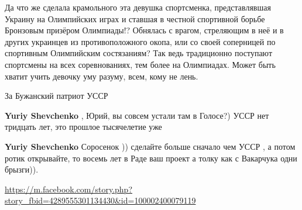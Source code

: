 \begin{itemize}
Да что же сделала крамольного эта девушка спортсменка, представлявшая Украину
на Олимпийских играх и ставшая в честной спортивной борьбе Бронзовым призёром
Олимпиады!? Обнялась с врагом, стреляющим в неё и в других украинцев из
противоположного окопа, или со своей соперницей по спортивным Олимпийским
состязаниям? Так ведь традиционно поступают спортсмены на всех соревнованиях,
тем более на Олимпиадах. Может быть хватит учить девочку уму разуму, всем, кому
не лень.


 
За Бужанский патриот УССР \Smiley[1.0][yellow]

\begin{itemize}
 
\textbf{Yuriy Shevchenko} , Юрий, вы совсем устали там в Голосе?) УССР нет тридцать лет, это прошлое тысячелетие уже

 
\textbf{Yuriy Shevchenko} Соросенок )) сделайте больше сначало чем УССР , а потом ротик открывайте, то восемь лет в Раде ваш проект а толку как с Вакарчука одни брызги)).
\end{itemize}

 
\url{https://m.facebook.com/story.php?story_fbid=4289555301134430&id=100002400079119}

 

\end{itemize}
